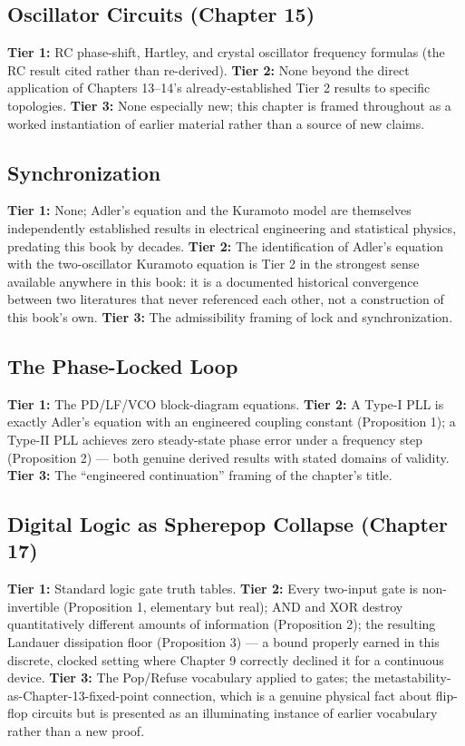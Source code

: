 \documentclass[12pt]{article}
\begin{document}
\subsection*{Oscillator Circuits (Chapter 15)}
\textbf{Tier 1:} RC phase-shift, Hartley, and crystal oscillator frequency formulas (the RC result cited rather than re-derived).
\textbf{Tier 2:} None beyond the direct application of Chapters 13--14's already-established Tier 2 results to specific topologies.
\textbf{Tier 3:} None especially new; this chapter is framed throughout as a worked instantiation of earlier material rather than a source of new claims.

\subsection*{Synchronization}
\textbf{Tier 1:} None; Adler's equation and the Kuramoto model are themselves independently established results in electrical engineering and statistical physics, predating this book by decades.
\textbf{Tier 2:} The identification of Adler's equation with the two-oscillator Kuramoto equation is Tier 2 in the strongest sense available anywhere in this book: it is a documented historical convergence between two literatures that never referenced each other, not a construction of this book's own.
\textbf{Tier 3:} The admissibility framing of lock and synchronization.

\subsection*{The Phase-Locked Loop}
\textbf{Tier 1:} The PD/LF/VCO block-diagram equations.
\textbf{Tier 2:} A Type-I PLL is exactly Adler's equation with an engineered coupling constant (Proposition 1); a Type-II PLL achieves zero steady-state phase error under a frequency step (Proposition 2) --- both genuine derived results with stated domains of validity.
\textbf{Tier 3:} The ``engineered continuation'' framing of the chapter's title.

\subsection*{Digital Logic as Spherepop Collapse (Chapter 17)}
\textbf{Tier 1:} Standard logic gate truth tables.
\textbf{Tier 2:} Every two-input gate is non-invertible (Proposition 1, elementary but real); AND and XOR destroy quantitatively different amounts of information (Proposition 2); the resulting Landauer dissipation floor (Proposition 3) --- a bound properly earned in this discrete, clocked setting where Chapter 9 correctly declined it for a continuous device.
\textbf{Tier 3:} The Pop/Refuse vocabulary applied to gates; the metastability-as-Chapter-13-fixed-point connection, which is a genuine physical fact about flip-flop circuits but is presented as an illuminating instance of earlier vocabulary rather than a new proof.
\end{document}

